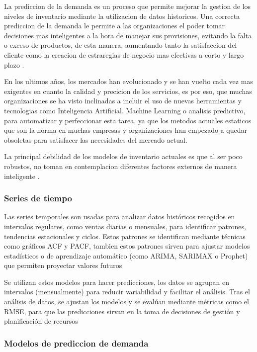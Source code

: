 La prediccion de la demanda es un proceso que permite mejorar la gestion de los niveles de inventario mediante la utilizacion de datos historicos. Una correcta prediccion de la demanda le permite a las organizaciones el poder tomar decisiones mas inteligentes a la hora de manejar sus provisiones, evitando la falta o exceso de productos, de esta manera, aumentando tanto la satisfaccion del cliente como la creacion de estraregias de negocio mas efectivas a corto y largo plazo \cite{ibm_prevision_demanda}.

En los ultimos años, los mercados han evolucionado y se han vuelto cada vez mas exigentes en cuanto la calidad y precicion de los servicios, es por eso, que muchas organizaciones se ha visto inclinadas a incluir el uso de nuevas herramientas y tecnologias como Inteligencia Artificial. Machine Learning o analisis predictivo, para automatizar y perfeccionar esta tarea, ya que los metodos actuales estaticos que son la norma en muchas empresas y organizaciones han empezado a quedar obsoletas para satisfacer las necesidades del mercado actual.\cite{ibm_prevision_demanda, valencia2015}

La principal debilidad de los modelos de inventario actuales es que al ser poco robustos, no toman en contemplacion diferentes factores externos de manera inteligente \cite{valencia2015}. 

\subsubsection{Series de tiempo}

Las series temporales son usadas para analizar datos históricos recogidos en intervalos regulares, como ventas diarias o mensuales, para identificar patrones, tendencias estacionales y ciclos. Estos patrones se identifican mediante técnicas como gráficos ACF y PACF, tambien estos patrones sirven para ajustar modelos estadísticos o de aprendizaje automático (como ARIMA, SARIMAX o Prophet) que permiten proyectar valores futuros \cite{10596_69801}

Se utilizan estos modelos para hacer predicciones, los datos se agrupan en intervalos (mensualmente) para reducir variabilidad y facilitar el análisis. Tras el análisis de datos, se ajustan los modelos y se evalúan mediante métricas como el RMSE, para que las predicciones sirvan en la toma de decisiones de gestión y planificación de recursos


\subsubsection{Modelos de prediccion de demanda}


